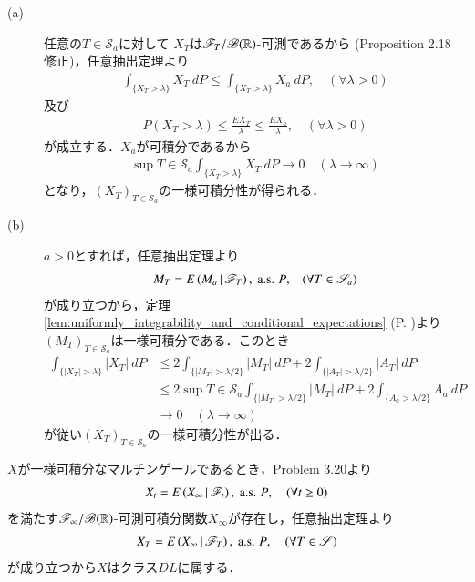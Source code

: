	\begin{prf}\mbox{}
		\begin{description}
			\item[(a)]
				任意の$T \in \mathscr{S}_a$に対して
				$X_T$は$\mathscr{F}_T/\mathscr{B}(\mathbb{R})$-可測であるから
				(Proposition 2.18 修正)，任意抽出定理より
				\begin{align}
					\int_{\{X_T > \lambda\}} X_T\ dP
					\leq \int_{\{X_T > \lambda\}} X_a\ dP,
					\quad (\forall \lambda > 0)
				\end{align}
				及び
				\begin{align}
					P\left( X_T > \lambda \right)
					\leq \frac{EX_T}{\lambda}
					\leq \frac{EX_a}{\lambda},
					\quad (\forall \lambda > 0)
				\end{align}
				が成立する．$X_a$が可積分であるから
				\begin{align}
					\sup{T \in \mathscr{S}_a}{\int_{\{X_T > \lambda\}} X_T\ dP}
					\longrightarrow 0
					\quad (\lambda \longrightarrow \infty)
				\end{align}
				となり，$(X_T)_{T \in \mathscr{S}_a}$の一様可積分性が得られる．
				
			\item[(b)]
				$a > 0$とすれば，任意抽出定理より
				\begin{align}
					M_T = E\left( M_a \, \middle|\, \mathscr{F}_T \right),\ \mbox{a.s. $P$,}
					\quad (\forall T \in \mathscr{S}_a)
				\end{align}
				が成り立つから，定理\ref{lem:uniformly_integrability_and_conditional_expectations}
				(P. \pageref{lem:uniformly_integrability_and_conditional_expectations})より
				$(M_T)_{T \in \mathscr{S}_a}$は一様可積分である．このとき
				\begin{align}
					\int_{\{|X_T| > \lambda\}} |X_T|\ dP
					&\leq 2\int_{\{|M_T| > \lambda/2\}} |M_T|\ dP + 2\int_{\{|A_T| > \lambda/2\}} |A_T|\ dP \\
					&\leq 2\sup{T \in \mathscr{S}_a}{\int_{\{|M_T| > \lambda/2\}} |M_T|\ dP} + 2\int_{\{A_a > \lambda/2\}} A_a\ dP \\
					&\longrightarrow 0 \quad (\lambda \longrightarrow \infty)
				\end{align}
				が従い$(X_T)_{T \in \mathscr{S}_a}$の一様可積分性が出る．
		\end{description}
		$X$が一様可積分なマルチンゲールであるとき，Problem 3.20より
		\begin{align}
			X_t = E\left( X_\infty \, \middle|\, \mathscr{F}_t \right),\ \mbox{a.s. $P$},
			\quad (\forall t \geq 0)
		\end{align}
		を満たす$\mathscr{F}_\infty/\mathscr{B}(\mathbb{R})$-可測可積分関数$X_\infty$が存在し，任意抽出定理より
		\begin{align}
			X_T = E\left( X_\infty \, \middle|\, \mathscr{F}_T \right),\ \mbox{a.s. $P$},
			\quad (\forall T \in \mathscr{S})
		\end{align}
		が成り立つから$X$はクラス$DL$に属する．
		\QED
	\end{prf}
	
